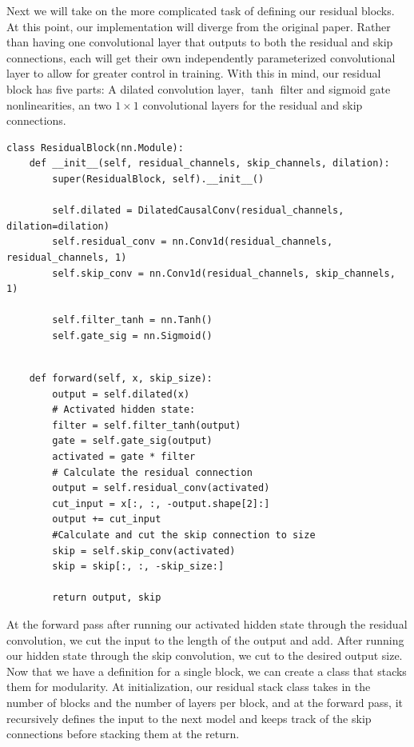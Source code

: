 Next we will take on the more complicated task of defining our residual blocks. At this point, our implementation will diverge from the original paper. Rather than having one convolutional layer that outputs to both the residual and skip connections, each will get their own independently parameterized convolutional layer to allow for greater control in training. With this in mind, our residual block has five parts: A dilated convolution layer, $\tanh$ filter and sigmoid gate nonlinearities, an two $1\times1$ convolutional layers for the residual and skip connections. 

\begin{verbatim}
class ResidualBlock(nn.Module):
    def __init__(self, residual_channels, skip_channels, dilation):
        super(ResidualBlock, self).__init__()

        self.dilated = DilatedCausalConv(residual_channels, dilation=dilation)
        self.residual_conv = nn.Conv1d(residual_channels, residual_channels, 1)
        self.skip_conv = nn.Conv1d(residual_channels, skip_channels, 1)

        self.filter_tanh = nn.Tanh()
        self.gate_sig = nn.Sigmoid()

\end{verbatim}
\newpage
\begin{verbatim}

    def forward(self, x, skip_size):
        output = self.dilated(x)
        # Activated hidden state:
        filter = self.filter_tanh(output)
        gate = self.gate_sig(output)
        activated = gate * filter
        # Calculate the residual connection
        output = self.residual_conv(activated)
        cut_input = x[:, :, -output.shape[2]:]
        output += cut_input
        #Calculate and cut the skip connection to size
        skip = self.skip_conv(activated)
        skip = skip[:, :, -skip_size:]

        return output, skip
\end{verbatim}


At the forward pass after running our activated hidden state through the residual convolution, we cut the input to the length of the output and add. After running our hidden state through the skip convolution, we cut to the desired output size. Now that we have a definition for a single block, we can create a class that stacks them for modularity. At initialization, our residual stack class takes in the number of blocks and the number of layers per block, and at the forward pass, it recursively defines the input to the next model and keeps track of the skip connections before stacking them at the return.


